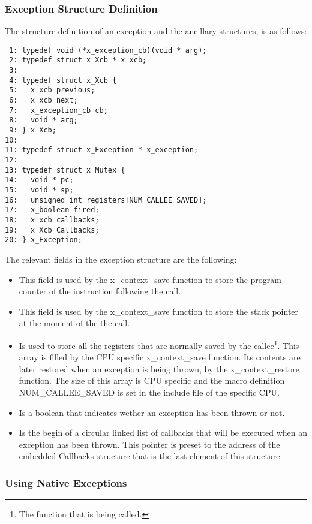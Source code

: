 \subsubsection{Exception Structure Definition}

The structure definition of an exception and the ancillary structures, is as follows:

\bcode
\begin{verbatim}
 1: typedef void (*x_exception_cb)(void * arg);
 2: typedef struct x_Xcb * x_xcb;
 3:
 4: typedef struct x_Xcb {
 5:   x_xcb previous;
 6:   x_xcb next;
 7:   x_exception_cb cb;
 8:   void * arg;
 9: } x_Xcb;
10:
11: typedef struct x_Exception * x_exception;
12:
13: typedef struct x_Mutex {
14:   void * pc;
15:   void * sp;
16:   unsigned int registers[NUM_CALLEE_SAVED];
17:   x_boolean fired;
18:   x_xcb callbacks;
19:   x_Xcb Callbacks;
20: } x_Exception;
\end{verbatim}
\ecode

The relevant fields in the exception structure are the following:

\begin{itemize}
\item {} This field is used by the
\textsf{x\_context\_save} function to store the program counter of the
instruction following the call.
\item {} This field is used by the
\textsf{x\_context\_save} function to store the stack pointer at the moment
of the the call.
\item {} Is used to store all the
registers that are normally saved by the callee\footnote{The function that
is being called.}. This array is filled by the CPU specific
\textsf{x\_context\_save} function. Its contents are later restored when an
exception is being thrown, by the \textsf{x\_context\_restore} function. The
size of this array is CPU specific and the macro definition
\textsf{NUM\_CALLEE\_SAVED} is set in the include file of the specific CPU.
\item {} Is a boolean that indicates wether
an exception has been thrown or not.
\item {} Is the begin of a circular
linked list of callbacks that will be executed when an exception has been
thrown. This pointer is preset to the address of the embedded
\textsf{Callbacks} structure that is the last element of this structure.
\end{itemize}

\subsubsection{Using Native Exceptions}
